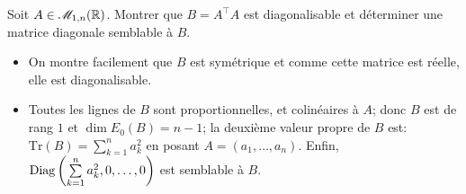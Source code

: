 \begin{exercice}
    Soit $A \in \mathscr{M}_{1,n} (\mathbb{R})$. Montrer que $B = A^\top A$ est diagonalisable et déterminer une matrice diagonale semblable à $B$.
\end{exercice}


\begin{solution}
    \begin{itemize}
        \item On montre facilement que $B$ est symétrique et comme cette matrice est réelle, elle est diagonalisable.
        \item Toutes les lignes de $B$ sont proportionnelles, et colinéaires à $A$; donc $B$ est de rang $1$ et $\dim E_0(B) = n-1$; la deuxième valeur propre de $B$ est: $\mathrm{Tr}(B) = \sum\limits_{k = 1}^{n} a_k^2$ en posant $A = (a_1, \dots, a_n)$. Enfin, $\mathrm{Diag} \left(\sum\limits_{k = 1}^{n} a_k^2, 0, \dots, 0 \right)$ est semblable à $B$.
    \end{itemize}
\end{solution}
